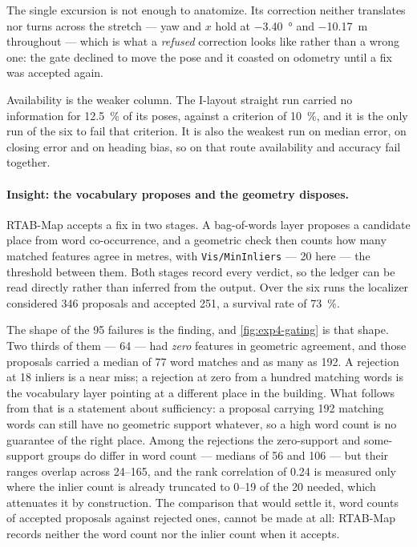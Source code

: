 \documentclass[11pt,a4paper,notitlepage]{report}
\begin{document}
The single excursion is not enough to anatomize. Its correction neither
translates nor turns across the stretch --- yaw and $x$ hold at
\SI{-3.40}{\degree} and \SI{-10.17}{\metre} throughout --- which is what a
\emph{refused} correction looks like rather than a wrong one: the gate declined
to move the pose and it coasted on odometry until a fix was accepted again.


Availability is the weaker column. The I-layout straight run carried no
information for \SI{12.5}{\percent} of its poses, against a criterion of
\SI{10}{\percent}, and it is the only run of the six to fail that criterion.
It is also the weakest run on median error, on closing error and on heading
bias, so on that route availability and accuracy fail together.

\paragraph{Insight: the vocabulary proposes and the geometry disposes.}
RTAB-Map accepts a fix in two stages. A bag-of-words layer proposes a candidate
place from word co-occurrence, and a geometric check then counts how many
matched features agree in metres, with \texttt{Vis/MinInliers} --- 20 here ---
the threshold between them. Both stages record every verdict, so the ledger can
be read directly rather than inferred from the output.
Over the six runs the localizer
considered \num{346} proposals and accepted \num{251}, a survival rate of
\SI{73}{\percent}.

The shape of the \num{95} failures is the finding, and
\cref{fig:exp4-gating} is that shape. Two thirds of them --- \num{64} --- had
\emph{zero} features in geometric agreement, and those proposals carried a
median of \num{77} word matches and as many as \num{192}. A rejection at
\num{18} inliers is a near miss; a rejection at zero from a hundred matching
words is the vocabulary layer pointing at a different place in the building.
What follows from that is a statement about sufficiency: a proposal carrying
\num{192} matching words can still have no geometric support whatever, so a
high word count is no guarantee of the right place.  Among the rejections the zero-support and some-support groups
do differ in word count --- medians of \num{56} and \num{106} --- but their
ranges overlap across \numrange{24}{165}, and the rank correlation of
\num{0.24} is measured only where the inlier count is already truncated to
\numrange{0}{19} of the \num{20} needed, which attenuates it by construction.
The comparison that would settle it, word counts of accepted proposals against
rejected ones, cannot be made at all: RTAB-Map records neither the word count
nor the inlier count when it accepts.
\end{document}
